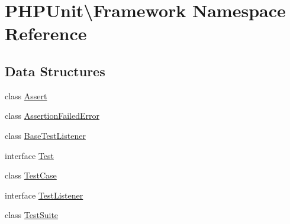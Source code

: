 \hypertarget{namespace_p_h_p_unit_1_1_framework}{}\section{P\+H\+P\+Unit\textbackslash{}Framework Namespace Reference}
\label{namespace_p_h_p_unit_1_1_framework}
\subsection*{Data Structures}
\begin{DoxyCompactItemize}
\item 
class \mbox{\hyperlink{class_p_h_p_unit_1_1_framework_1_1_assert}{Assert}}
\item 
class \mbox{\hyperlink{class_p_h_p_unit_1_1_framework_1_1_assertion_failed_error}{Assertion\+Failed\+Error}}
\item 
class \mbox{\hyperlink{class_p_h_p_unit_1_1_framework_1_1_base_test_listener}{Base\+Test\+Listener}}
\item 
interface \mbox{\hyperlink{interface_p_h_p_unit_1_1_framework_1_1_test}{Test}}
\item 
class \mbox{\hyperlink{class_p_h_p_unit_1_1_framework_1_1_test_case}{Test\+Case}}
\item 
interface \mbox{\hyperlink{interface_p_h_p_unit_1_1_framework_1_1_test_listener}{Test\+Listener}}
\item 
class \mbox{\hyperlink{class_p_h_p_unit_1_1_framework_1_1_test_suite}{Test\+Suite}}
\end{DoxyCompactItemize}
